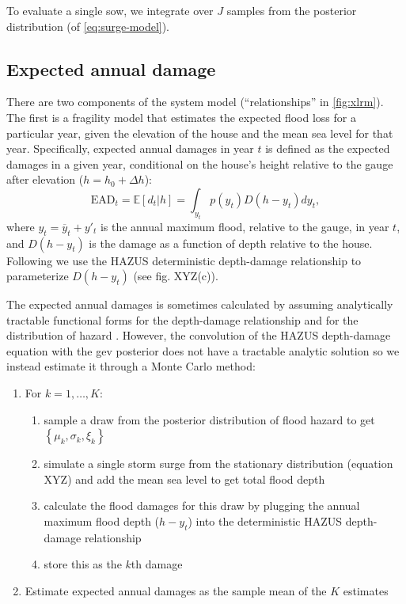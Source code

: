 \documentclass[12pt]{article}
\makeatletter
\newcommand{\james}[1]{\todo[color=giallo, textcolor=nero]{\textbf{ATTN James:~}#1}} %
\DeclareRobustCommand\onedot{\futurelet\@let@token\@onedot}
\def\@onedot{\ifx\@let@token.\else.\null\fi\xspace}
\def\eg{\emph{e.g}\onedot} \def\Eg{\emph{E.g}\onedot}
\DeclareRobustCommand\onedot{\futurelet\@let@token\@onedot}
\def\@onedot{\ifx\@let@token.\else.\null\fi\xspace}
\def\eg{\emph{e.g}\onedot} \def\Eg{\emph{E.g}\onedot}
\makeatother
\begin{document}
To evaluate a single \gls{sow}, we integrate over $J$ samples from the posterior distribution (of \cref{eq:surge-model}).

\subsection{Expected annual damage}\label{sec:ead}

There are two components of the system model (``relationships'' in \cref{fig:xlrm}).
The first is a fragility model that estimates the expected flood loss for a particular year, given the elevation of the house and the mean sea level for that year.
Specifically, expected annual damages in year $t$ is defined as the expected damages in a given year, conditional on the house's height relative to the gauge after elevation ($h = h_0 + \Delta h$):
\begin{equation}\label{eq:ead}
    \textrm{EAD}_t = \mathbb{E}[d_t | h] = \int_{y_t} p(y_t) D(h - y_t) dy_t,
\end{equation}
where $y_t = \overline{y}_t + y'_t$ is the annual maximum flood, relative to the gauge, in year $t$, and $D(h - y_t)$ is the damage as a function of depth relative to the house.
Following \citet{zarekarizi_suboptimal:2020} we use the HAZUS deterministic depth-damage relationship to parameterize $D(h-y_t)$ (see fig. XYZ(c)).\james{Cite HAZUS}

The expected annual damages is sometimes calculated by assuming analytically tractable functional forms for the depth-damage relationship and for the  distribution of hazard \citep[\eg][]{vandantzig_dike:1956}.
However, the convolution of the HAZUS depth-damage equation with the \gls{gev} posterior does not have a tractable analytic solution so we instead estimate it through a Monte Carlo method:
\begin{enumerate}
    \item For $k=1, \ldots, K$:
          \begin{enumerate}
              \item sample a draw from the posterior distribution of flood hazard to get $\left\{ \mu_k, \sigma_k, \xi_k \right\}$
              \item simulate a single storm surge from the stationary distribution (equation XYZ) and add the mean sea level to get total flood depth
              \item calculate the flood damages for this draw by plugging the annual maximum flood depth ($h - y_t$) into  the deterministic HAZUS depth-damage relationship
              \item store this as the $k$th damage
          \end{enumerate}
    \item Estimate expected annual damages as the sample mean of the $K$ estimates
\end{enumerate}
\end{document}
